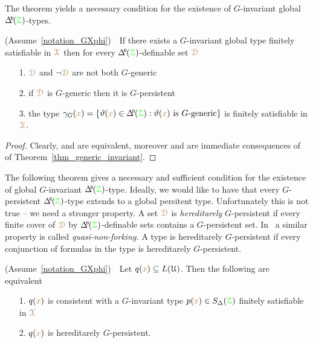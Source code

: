 The theorem yields a necessary condition for the existence of $G$-invariant global $\BDelta({\grZ})$-types.

\begin{corollary}\label{corol_def_mu}
  (Assume~\ref{notation_GXphi})\ \  
  If there exists a $G$-invariant global type finitely satisfiable in ${\color{brown}\EuScript X}$ then for every $\BDelta({\grZ})$-definable set ${\color{brown}\EuScript D}$
  \begin{itemize}
    \item[1.] ${\color{brown}\EuScript D}$ and $\neg{\color{brown}\EuScript D}$ are not both $G$-generic
    \item[2.] if ${\color{brown}\EuScript D}$ is $G$-generic then it is $G$-persistent
    \item[3.] the type $\gamma_G({\mr x})=\{\theta({\mr x})\in \BDelta({\grZ}): \theta({\mr x})\textrm{ is }G\textrm{-generic}\}$ is finitely satisfiable in ${\color{brown}\EuScript X}$.
  \end{itemize}
\end{corollary}

\begin{proof}
  Clearly,  and  are equivalent, moreover  and  are immediate consequences of  of Theorem~\ref{thm_generic_invariant}.
\end{proof}

The following theorem gives a necessary and sufficient condition for the  existence of global $G$-invariant $\BDelta({\grZ})$-type.
Ideally, we would like to have that every $G$-persistent $\BDelta({\grZ})$-type extends to a global persitent type.
Unfortunately this is not true -- we need a stronger property.
A set ${\color{brown}\EuScript D}$ is \emph{hereditarely\/} $G$-persistent if every finite cover of ${\color{brown}\EuScript D}$ by $\BDelta({\grZ})$-definable sets contains a $G$-persistent set.
In~\cite{CK} a similar property is called \textit{quasi-non-forking.}
A type is hereditarely $G$-persistent if every conjunction of formulas in the type is hereditarely $G$-persistent.

\begin{theorem}\label{thm_generic_invariant2}
  (Assume~\ref{notation_GXphi})\ \  
  Let $q({\color{brown} x})\subseteq L(\EuScript U)$.
  Then the following are equivalent 
  \begin{itemize}
    \item[1.] $q({\color{brown} x})$ is consistent with a $G$-invariant type $p({\color{brown} x})\in S_\Delta({\color{green}\EuScript Z})$ finitely satisfiable in ${\color{brown}\EuScript X}$
    \item[2.] $q({\color{brown} x})$ is hereditarely $G$-persistent.
  \end{itemize}
\end{theorem}

